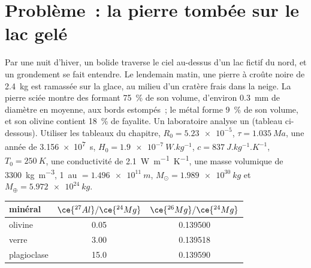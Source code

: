 \section{Problème~: la pierre tombée sur le lac gelé}

\begin{problem}
\label{pb:b2:planet-formation-meteorites:1}
Par une nuit d'hiver, un bolide traverse le ciel au-dessus d'un lac fictif du nord, et
un grondement se fait entendre. Le lendemain matin, une pierre à croûte noire de
\qty{2.4}{kg} est ramassée sur la glace, au milieu d'un cratère frais dans la neige. La
pierre sciée montre des  formant \qty{75}{\percent} de son volume, d'environ
\qty{0.3}{mm} de diamètre en moyenne, aux bords estompés~; le métal forme
\qty{9}{\percent} de son volume, et son olivine contient 18~\% de fayalite. Un
laboratoire analyse un  (tableau ci-dessous). Utiliser les tableaux du chapitre,
$R_0 = \num{5.23e-5}$, $\tau = \qty{1.035}{Ma}$, une année de \qty{3.156e7}{s},
$H_0 = \qty{1.9e-7}{W.kg^{-1}}$, $c = \qty{837}{J.kg^{-1}.K^{-1}}$,
$T_0 = \qty{250}{K}$, une conductivité de \qty{2.1}{W.m^{-1}.K^{-1}}, une masse
volumique de \qty{3300}{kg.m^{-3}}, \qty{1}{au} $= \qty{1.496e11}{m}$,
$M_\odot = \qty{1.989e30}{kg}$ et $M_\oplus = \qty{5.972e24}{kg}$.

\begin{center}
\small
\begin{tabular}{lcc}
\hline
minéral & $\ce{^{27}Al}/\ce{^{24}Mg}$ & $\ce{^{26}Mg}/\ce{^{24}Mg}$\\
\hline
olivine & 0.05 & \num{0.139500}\\
verre & 3.00 & \num{0.139518}\\
plagioclase & 15.0 & \num{0.139590}\\
\hline
\end{tabular}
\end{center}


\end{problem}
